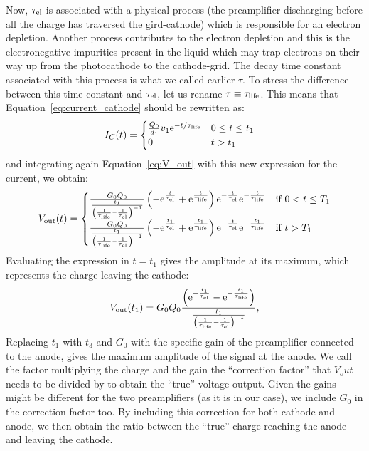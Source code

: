 \documentclass[a4paper,11pt]{article}
\providecommand*{\eu}%
{\ensuremath{\mathrm{e}}}
\begin{document}
Now, $\tau_{\rm el}$ is associated with a physical process (the preamplifier discharging before all the charge has traversed the gird-cathode) which is responsible for an electron depletion. Another process contributes to the electron depletion and this is the electronegative impurities present in the liquid which may trap electrons on their way up from the photocathode to the cathode-grid. The decay time constant associated with this process is what we called earlier $\tau$. To stress the difference between this time constant and $\tau_{\rm el}$, let us rename $\tau \equiv \tau_{\rm life}$.
This means that Equation~\ref{eq:current_cathode} should be rewritten as:
\begin{align}
 I_C(t) &=
  \begin{cases}
   \frac{Q_0}{d_1}v_{1} \eu^{-t/\tau_{\rm life}}  
                            & 0 \leq t \leq t_{1} \\
   0        			    & t > t_{1}
  \end{cases}
\end{align}
and integrating again Equation~\ref{eq:V_out} with this new expression for the current, we obtain:
\begin{equation}
V_{\rm out} (t) = \begin{cases}
\frac{G_0 Q_0
}{
\frac{t_{1}}{\left (\frac{1}{\tau_{\rm life}}-\frac{1}{\tau_{\rm el}}\right )^{-1}}
} \left(-\eu^{\frac{t}{\tau_{\rm el}}}+\eu^{\frac{t}{\tau_{\rm life}}}\right) \eu^{-\frac{t}{\tau_{\rm el}}} \eu^{-\frac{t}{\tau_{\rm life}}} &\text{if $0 < t \leq T_1$}\\
\frac{G_0 Q_0
}{
\frac{t_{1}}{\left (\frac{1}{\tau_{\rm life}}-\frac{1}{\tau_{\rm el}}\right )^{-1}}
} \left(-\eu^{\frac{t_1}{\tau_{\rm el}}}+\eu^{\frac{t_1}{\tau_{\rm life}}}\right) \eu^{-\frac{t}{\tau_{\rm el}}} \eu^{-\frac{t_1}{\tau_{\rm life}}} &\text{if $t > T_1$}
\end{cases}
\end{equation}
Evaluating the expression in $t=t_1$ gives the amplitude at its maximum, which represents the charge leaving the cathode: 
\begin{equation}
V_{\rm out}(t_1) = G_0 Q_0 \frac{
\left(\eu^{-\frac{t_1}{\tau_{\rm el}}}-\eu^{-\frac{t_1}{\tau_{\rm life}}}\right)
}{
\frac{t_{1}}{\left (\frac{1}{\tau_{\rm life}}-\frac{1}{\tau_{\rm el}}\right )^{-1}}
},
\end{equation}
Replacing $t_1$ with $t_3$ and $G_0$ with the specific gain of the preamplifier connected to the anode, gives the maximum amplitude of the signal at the anode. 
We call the factor multiplying the charge and the gain the ``correction factor'' that $V_out$ needs to be divided by to obtain the ``true'' voltage output. Given the gains might be different for the two preamplifiers (as it is in our case), we include $G_0$ in the correction factor too. By including this correction for both cathode and anode, we then obtain the ratio between the ``true'' charge reaching the anode and leaving the cathode. 
\end{document}
